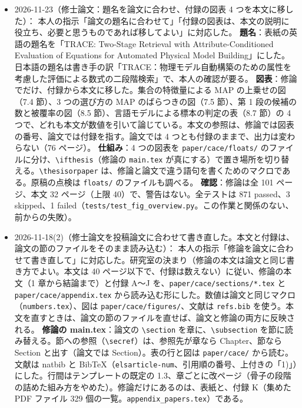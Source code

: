 \documentclass[11pt,a4paper]{jsarticle}
\begin{document}
\begin{itemize}[nosep]
  \item 2026-11-23（修士論文：題名を論文に合わせ、付録の図表 4 つを本文に移した）：
    本人の指示「論文の題名に合わせて」「付録の図表は、本文の説明に役立ち、必要と思うものであれば移してよい」に対応した。
    \textbf{題名}：表紙の英語の題名を「TRACE: Two-Stage Retrieval with Attribute-Conditioned Evaluation of Equations for Automated Physical Model Building」にした。日本語の題名は書き手の訳「TRACE：物理モデル自動構築のための属性を考慮した評価による数式の二段階検索」で、本人の確認が要る。
    \textbf{図表}：修論でだけ、付録から本文に移した。集合の特徴量による MAP の上乗せの図（7.4 節）、3 つの選び方の MAP のばらつきの図（7.5 節）、第 1 段の候補の数と被覆率の図（8.5 節）、言語モデルによる標本の判定の表（8.7 節）の 4 つで、どれも本文が数値を引いて論じている。本文の参照は、修論では図表の番号、論文では付録を指す。論文では 4 つとも付録のままで、出力は変わらない（76 ページ）。
    \textbf{仕組み}：4 つの図表を \texttt{paper/cace/floats/} のファイルに分け、\texttt{\textbackslash ifthesis}（修論の \texttt{main.tex} が真にする）で置き場所を切り替える。\texttt{\textbackslash thesisorpaper} は、修論と論文で違う語句を書くためのマクロである。原稿の点検は \texttt{floats/} のファイルも調べる。
    \textbf{確認}：修論は全 101 ページ、本文 32 ページ（上限 40）で、警告はない。全テストは 871 passed、3 skipped、1 failed（\texttt{tests/test\_fig\_overview.py}。この作業と関係のない、前からの失敗）。
  \item 2026-11-18(2)（修士論文を投稿論文に合わせて書き直した。本文と付録は、論文の節のファイルをそのまま読み込む）：
    本人の指示「修論を論文に合わせて書き直して」に対応した。研究室の決まり（修論の本文は論文と同じ書き方でよい。本文は 40 ページ以下で、付録は数えない）に従い、修論の本文（1 章から結論まで）と付録 A〜J を、\texttt{paper/cace/sections/*.tex} と \texttt{paper/cace/appendix.tex} から読み込む形にした。数値は論文と同じマクロ（\texttt{numbers.tex}）、図は \texttt{paper/cace/figures/}、文献は \texttt{refs.bib} を使う。本文を直すときは、論文の節のファイルを直せば、論文と修論の両方に反映される。
    \textbf{修論の main.tex}：論文の \texttt{\textbackslash section} を章に、\texttt{\textbackslash subsection} を節に読み替える。節への参照（\texttt{\textbackslash secref}）は、参照先が章なら Chapter、節なら Section と出す（論文では Section）。表の行と図は \texttt{paper/cace/} から読む。文献は natbib と BibTeX（\texttt{elsarticle-num}、引用順の番号、上付きの「1)」）にした。行間はテンプレートの既定の 1.3、章ごとに改ページ（骨子の段階の詰めた組み方をやめた）。修論だけにあるのは、表紙と、付録 K（集めた PDF ファイル 329 個の一覧。\texttt{appendix\_papers.tex}）である。

\end{itemize}
\end{document}
